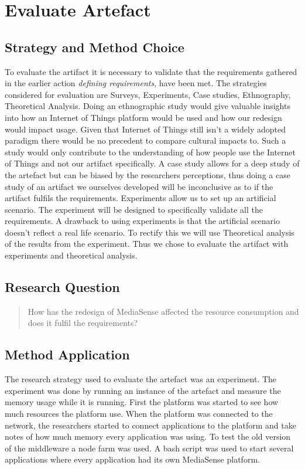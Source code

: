 \section{Evaluate Artefact}
\subsection{Strategy and Method Choice}
To evaluate the artifact it is necessary to validate that the requirements gathered in the earlier action \emph{defining requirements}, have been met. The strategies considered for evaluation are Surveys, Experiments, Case studies, Ethnography, Theoretical Analysis. 
Doing an ethnographic study would give valuable insights into how an Internet of Things platform would be used and how our redesign would impact usage. Given that Internet of Things still isn't a widely adopted paradigm there would be no precedent to compare cultural impacts to. Such a study would only contribute to the understanding of how people use the Internet of Things and not our artifact specifically. A case study allows for a deep study of the artefact but can be biased by the researchers perceptions, thus doing a case study of an artifact we ourselves developed will be inconclusive as to if the artifact fulfils the requirements.
Experiments allow us to set up an artificial scenario. The experiment will be designed to specifically validate all the requirements. A drawback to using experiments is that the artificial scenario doesn't reflect a real life scenario. To rectify this we will use Theoretical analysis of the results from the experiment. Thus we chose to evaluate the artifact with experiments and theoretical analysis.

\subsection{Research Question}
\begin{quotation}
How has the redesign of MediaSense affected the resource consumption and does it fulfil the requirements?
\end{quotation}

\subsection{Method Application}
The research strategy used to evaluate the artefact was an experiment. The experiment was done by running an instance of the artefact and measure the memory usage while it is running. First the platform was started to see how much resources the platform use. When the platform was connected to the network, the researchers started to connect applications to the platform and take notes of how much memory every application was using. To test the old version of the middleware a node farm was used. A bash script was used to start several applications where every application had its own MediaSense platform. 

